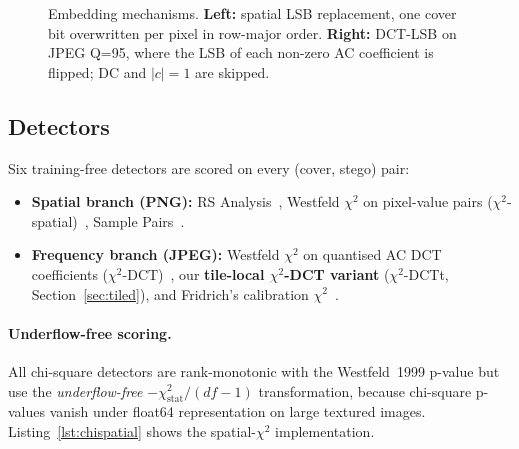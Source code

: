 \documentclass[10pt,twocolumn,a4paper]{article}
\begin{document}
\begin{figure}[t]
\vspace{-2mm}
\caption{Embedding mechanisms. \textbf{Left:} spatial LSB replacement, one cover bit overwritten per pixel in row-major order. \textbf{Right:} DCT-LSB on JPEG Q=95, where the LSB of each non-zero AC coefficient is flipped; DC and $|c|\!=\!1$ are skipped.}
\label{fig:lsbdct}
\end{figure}

\subsection{Detectors}
\label{sec:detectors}

Six training-free detectors are scored on every (cover, stego) pair:
\begin{itemize}
\item \textbf{Spatial branch (PNG):} RS Analysis~\cite{fridrich2001lsb}, Westfeld $\chi^2$ on pixel-value pairs ($\chi^2$-spatial)~\cite{westfeld1999chi}, Sample Pairs~\cite{dumitrescu2003sp}.
\item \textbf{Frequency branch (JPEG):} Westfeld $\chi^2$ on quantised AC DCT coefficients ($\chi^2$-DCT)~\cite{westfeld1999chi}, our \textbf{tile-local $\chi^2$-DCT variant} ($\chi^2$-DCTt, Section~\ref{sec:tiled}), and Fridrich's calibration $\chi^2$~\cite{fridrich2003calib}.
\end{itemize}

\paragraph{Underflow-free scoring.} All chi-square detectors are rank-monotonic with the Westfeld~1999 p-value but use the \emph{underflow-free} $-\chi^2_\text{stat}/(df\!-\!1)$ transformation, because chi-square p-values vanish under float64 representation on large textured images. Listing~\ref{lst:chispatial} shows the spatial-$\chi^2$ implementation.
\end{document}
